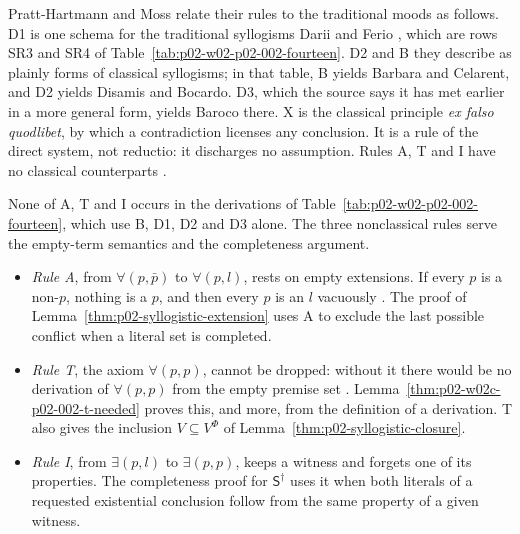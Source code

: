 Pratt-Hartmann and Moss relate their rules to the traditional moods as
follows. D1 is one schema for the traditional syllogisms Darii and Ferio
\cite[pp.~8--9]{PrattHartmannMoss2008SyllogisticV1}, which are rows SR3 and
SR4 of Table~\ref{tab:p02-w02-p02-002-fourteen}. D2 and B they describe as
plainly forms of classical syllogisms; in that table, B yields Barbara and
Celarent, and D2 yields Disamis and Bocardo. D3, which the source says it
has met earlier in a more general form, yields Baroco there. X is the classical principle
\emph{ex falso quodlibet}, by which a contradiction licenses any conclusion.
It is a rule of the direct system, not reductio: it discharges no
assumption. Rules A, T and I have no classical counterparts
\cite[p.~12]{PrattHartmannMoss2008SyllogisticV1}.

None of A, T and I occurs in the derivations of
Table~\ref{tab:p02-w02-p02-002-fourteen}, which use B, D1, D2 and D3 alone.
The three nonclassical rules serve the empty-term semantics and the
completeness argument.
\begin{itemize}
\item \emph{Rule A}, from \(\forall(p,\bar p)\) to \(\forall(p,l)\), rests on
 empty extensions. If every \(p\) is a non-\(p\), nothing is a \(p\), and
 then every \(p\) is an \(l\) vacuously
 \cite[p.~12]{PrattHartmannMoss2008SyllogisticV1}. The proof of
 Lemma~\ref{thm:p02-syllogistic-extension} uses A to exclude the last
 possible conflict when a literal set is completed.
\item \emph{Rule T}, the axiom \(\forall(p,p)\), cannot be dropped: without
 it there would be no derivation of \(\forall(p,p)\) from the empty premise
 set \cite[p.~12]{PrattHartmannMoss2008SyllogisticV1}.
 Lemma~\ref{thm:p02-w02c-p02-002-t-needed} proves this, and more, from the
 definition of a derivation. T also gives the inclusion
 \(V\subseteq V^\Phi\) of Lemma~\ref{thm:p02-syllogistic-closure}.
\item \emph{Rule I}, from \(\exists(p,l)\) to \(\exists(p,p)\), keeps a
 witness and forgets one of its properties. The completeness proof for
 \(\mathsf S^\dagger\) uses it when both literals of a requested existential
 conclusion follow from the same property of a given witness.
\end{itemize}

